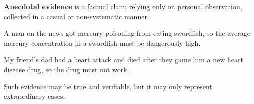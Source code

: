 \documentclass{beamer}
\begin{document}
\begin{frame}
\begin{definition}
\textbf{Anecdotal evidence} is a factual claim relying only on personal observation, collected in a casual or non-systematic manner.
\end{definition}\pause

\begin{example}
A man on the news got mercury poisoning from eating swordfish, so the average mercury concentration in a swordfish must be dangerously high.
\end{example}\pause

\begin{example}
My friend's dad had a heart attack and died after they game him a new heart disease drug, so the drug must not work.
\end{example}\pause

\begin{note}
Such evidence may be true and verifiable, but it may only represent extraordinary cases. 
\end{note}
\end{frame}
\end{document}
